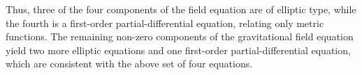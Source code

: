 \documentclass[12pt]{article}
\def\be{\begin{equation}}
\def\ee{\end{equation}}
\begin{document}
Thus, three of the four components of the field equation are
of elliptic type, while the fourth is a first-order
partial-differential
equation, relating only metric functions. The remaining non-zero
components of the gravitational field equation yield two more
elliptic equations and one first-order partial-differential equation,
which are consistent with the above set of four equations. 

%
%
\end{document}
